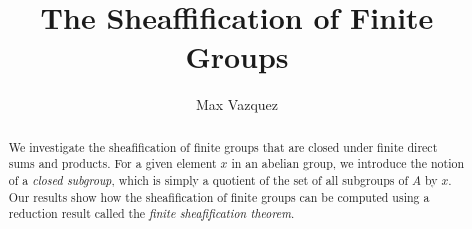\documentclass[a4paper,reqno,oneside]{article}
\begin{document}
\title{The Sheaffification of Finite Groups}
\author{Max Vazquez}
\maketitle


\begin{abstract}
    We investigate the sheafification of finite groups that are closed under finite direct sums and products. For a given element $x$ in an abelian group, we introduce the notion of a \textit{closed subgroup}, which is simply a quotient of the set of all subgroups of $A$ by $x$. Our results show how the sheafification of finite groups can be computed using a reduction result called the \textit{finite sheafification theorem}. 

\end{abstract}







\end{document}
